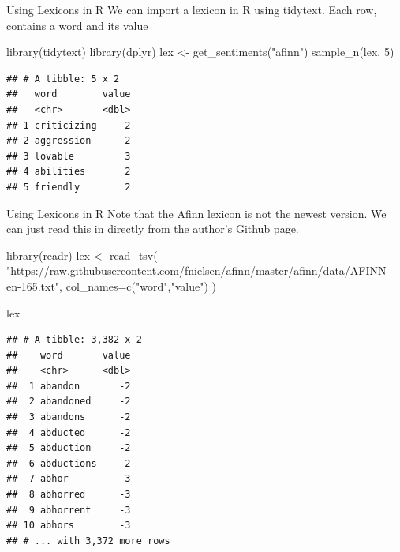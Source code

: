 \documentclass[
  10pt,
  ignorenonframetext,
  aspectratio=169]{beamer}
\newenvironment{Shaded}{\begin{snugshade}}{\end{snugshade}}
\newcommand{\AttributeTok}[1]{\textcolor[rgb]{0.80,0.80,0.80}{#1}}
\newcommand{\DecValTok}[1]{\textcolor[rgb]{0.86,0.86,0.80}{#1}}
\newcommand{\FunctionTok}[1]{\textcolor[rgb]{0.94,0.94,0.56}{#1}}
\newcommand{\NormalTok}[1]{\textcolor[rgb]{0.80,0.80,0.80}{#1}}
\newcommand{\OtherTok}[1]{\textcolor[rgb]{0.94,0.94,0.56}{#1}}
\newcommand{\StringTok}[1]{\textcolor[rgb]{0.80,0.58,0.58}{#1}}
\begin{document}
\begin{frame}[fragile]{Using Lexicons in R}
\protect\hypertarget{using-lexicons-in-r}{}
We can import a lexicon in R using tidytext. Each row, contains a word
and its value

\medskip

\begin{Shaded}
\begin{Highlighting}[]
\FunctionTok{library}\NormalTok{(tidytext)}
\FunctionTok{library}\NormalTok{(dplyr)}
\NormalTok{lex }\OtherTok{\textless{}{-}} \FunctionTok{get\_sentiments}\NormalTok{(}\StringTok{"afinn"}\NormalTok{)}
\FunctionTok{sample\_n}\NormalTok{(lex, }\DecValTok{5}\NormalTok{)}
\end{Highlighting}
\end{Shaded}

\begin{verbatim}
## # A tibble: 5 x 2
##   word        value
##   <chr>       <dbl>
## 1 criticizing    -2
## 2 aggression     -2
## 3 lovable         3
## 4 abilities       2
## 5 friendly        2
\end{verbatim}
\end{frame}

\begin{frame}[fragile]{Using Lexicons in R}
\protect\hypertarget{using-lexicons-in-r-1}{}
Note that the Afinn lexicon is not the newest version. We can just read
this in directly from the author's Github page.

\medskip

\begin{Shaded}
\begin{Highlighting}[]
\FunctionTok{library}\NormalTok{(readr)}
\NormalTok{lex }\OtherTok{\textless{}{-}} \FunctionTok{read\_tsv}\NormalTok{(}
  \StringTok{"https://raw.githubusercontent.com/fnielsen/afinn/master/afinn/data/AFINN{-}en{-}165.txt"}\NormalTok{,}
  \AttributeTok{col\_names=}\FunctionTok{c}\NormalTok{(}\StringTok{"word"}\NormalTok{,}\StringTok{"value"}\NormalTok{)}
\NormalTok{)}

\NormalTok{lex}
\end{Highlighting}
\end{Shaded}

\begin{verbatim}
## # A tibble: 3,382 x 2
##    word       value
##    <chr>      <dbl>
##  1 abandon       -2
##  2 abandoned     -2
##  3 abandons      -2
##  4 abducted      -2
##  5 abduction     -2
##  6 abductions    -2
##  7 abhor         -3
##  8 abhorred      -3
##  9 abhorrent     -3
## 10 abhors        -3
## # ... with 3,372 more rows
\end{verbatim}
\end{frame}
\end{document}
